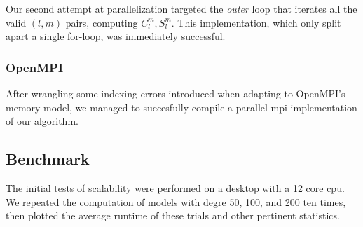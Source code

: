 \documentclass[a4paper]{article}
\theoremstyle{definition}
\begin{document}
    Our second attempt at parallelization targeted the \textit{outer} loop that iterates all the valid $(l, m)$ pairs, computing $C_l^m, S_l^m$. This implementation, which only split 
    apart a single for-loop, was immediately successful.
\subsubsection{OpenMPI}

After wrangling some indexing errors introduced when adapting to OpenMPI's memory model, we managed to succesfully compile a parallel mpi implementation
of our algorithm.

\subsection{Benchmark}

The initial tests of scalability were performed on a desktop with a 12 core cpu. We repeated the computation of models with degre 50, 100, and 200 ten times, then 
plotted the average runtime of these trials and other pertinent statistics.
\end{document}
